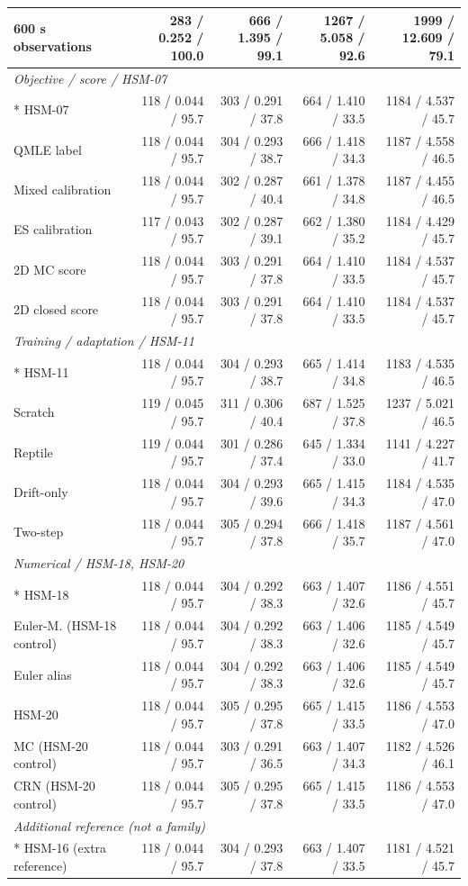 \begin{longtable}{@{}p{.25\linewidth}rrrr@{}}
600 s observations & 283 / 0.252 / 100.0 & 666 / 1.395 / 99.1 & 1267 / 5.058 / 92.6 & 1999 / 12.609 / 79.1\\
\midrule
\multicolumn{5}{l}{\textit{Objective / score / HSM-07}}\\*
HSM-07 & 118 / 0.044 / 95.7 & 303 / 0.291 / 37.8 & 664 / 1.410 / 33.5 & 1184 / 4.537 / 45.7\\
QMLE label & 118 / 0.044 / 95.7 & 304 / 0.293 / 38.7 & 666 / 1.418 / 34.3 & 1187 / 4.558 / 46.5\\
Mixed calibration & 118 / 0.044 / 95.7 & 302 / 0.287 / 40.4 & 661 / 1.378 / 34.8 & 1187 / 4.455 / 46.5\\
ES calibration & 117 / 0.043 / 95.7 & 302 / 0.287 / 39.1 & 662 / 1.380 / 35.2 & 1184 / 4.429 / 45.7\\
2D MC score & 118 / 0.044 / 95.7 & 303 / 0.291 / 37.8 & 664 / 1.410 / 33.5 & 1184 / 4.537 / 45.7\\
2D closed score & 118 / 0.044 / 95.7 & 303 / 0.291 / 37.8 & 664 / 1.410 / 33.5 & 1184 / 4.537 / 45.7\\
\midrule
\multicolumn{5}{l}{\textit{Training / adaptation / HSM-11}}\\*
HSM-11 & 118 / 0.044 / 95.7 & 304 / 0.293 / 38.7 & 665 / 1.414 / 34.8 & 1183 / 4.535 / 46.5\\
Scratch & 119 / 0.045 / 95.7 & 311 / 0.306 / 40.4 & 687 / 1.525 / 37.8 & 1237 / 5.021 / 46.5\\
Reptile & 119 / 0.044 / 95.7 & 301 / 0.286 / 37.4 & 645 / 1.334 / 33.0 & 1141 / 4.227 / 41.7\\
Drift-only & 118 / 0.044 / 95.7 & 304 / 0.293 / 39.6 & 665 / 1.415 / 34.3 & 1184 / 4.535 / 47.0\\
Two-step & 118 / 0.044 / 95.7 & 305 / 0.294 / 37.8 & 666 / 1.418 / 35.7 & 1187 / 4.561 / 47.0\\
\midrule
\multicolumn{5}{l}{\textit{Numerical / HSM-18, HSM-20}}\\*
HSM-18 & 118 / 0.044 / 95.7 & 304 / 0.292 / 38.3 & 663 / 1.407 / 32.6 & 1186 / 4.551 / 45.7\\
Euler-M. (HSM-18 control) & 118 / 0.044 / 95.7 & 304 / 0.292 / 38.3 & 663 / 1.406 / 32.6 & 1185 / 4.549 / 45.7\\
Euler alias & 118 / 0.044 / 95.7 & 304 / 0.292 / 38.3 & 663 / 1.406 / 32.6 & 1185 / 4.549 / 45.7\\
HSM-20 & 118 / 0.044 / 95.7 & 305 / 0.295 / 37.8 & 665 / 1.415 / 33.5 & 1186 / 4.553 / 47.0\\
MC (HSM-20 control) & 118 / 0.044 / 95.7 & 303 / 0.291 / 36.5 & 663 / 1.407 / 34.3 & 1182 / 4.526 / 46.1\\
CRN (HSM-20 control) & 118 / 0.044 / 95.7 & 305 / 0.295 / 37.8 & 665 / 1.415 / 33.5 & 1186 / 4.553 / 47.0\\
\midrule
\multicolumn{5}{l}{\textit{Additional reference (not a family)}}\\*
HSM-16 (extra reference) & 118 / 0.044 / 95.7 & 304 / 0.293 / 37.8 & 663 / 1.407 / 33.5 & 1181 / 4.521 / 45.7\\
\end{longtable}
\endgroup
\Needspace{.65\textheight}

